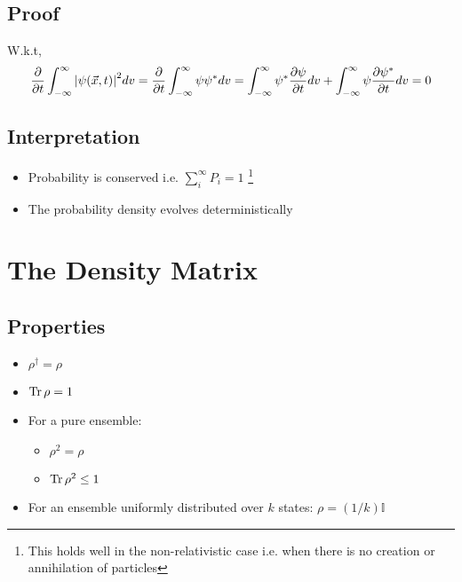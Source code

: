 \subsection{Proof}
W.k.t,
$$\frac{\partial}{\partial t}\int_{- \infty}^{\infty} \abs{\psi(\vec{x}, t)}^{2} dv = \frac{\partial}{\partial t}\int_{- \infty}^{\infty} \psi \psi^{*} dv = \int_{- \infty}^{\infty}  \psi^{*} \frac{\partial \psi}{\partial t} dv + \int_{- \infty}^{\infty}  \psi \frac{\partial \psi^{*}}{\partial t} dv = 0$$
\subsection{Interpretation}
\begin{itemize}
\item Probability is conserved i.e. $\sum_{i}^{\infty}P_{i} = 1$ \footnote{This holds well in the non-relativistic case i.e. when there is no creation or annihilation of particles}
\item The probability density evolves deterministically
\end{itemize}
\section{The Density Matrix}

\subsection{Properties}
\begin{itemize}
\item $\rho^{\dagger} = \rho$
\item$\Tr \rho= 1$
\item For a pure ensemble:
\begin{itemize}
\item $\rho^{2} = \rho$
\item $\Tr \rho^{2} \leq 1$
\end{itemize}
\item For an ensemble uniformly distributed over $k$ states: $\rho = (1/k)\mathbb{I}$
\end{itemize}